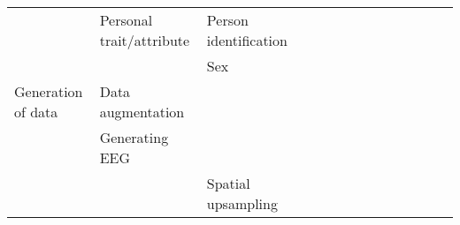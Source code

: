\begin{tabular}{p{1.5cm}p{1.5cm}p{1.5cm}p{1.5cm}p{0.6cm}p{0.6cm}p{0.6cm}p{0.6cm}p{0.6cm}p{0.6cm}p{0.6cm}p{0.6cm}p{0.6cm}p{0.6cm}}
                                & Personal trait/attribute & Person identification &   &                                                             &                                                                                                                             &                                                                        &                                      &                                                            &                      &                       &                                 &                         &                                        \cite{Zhang2017e, Zhang2017c} \\
                                &                 & Sex &   &                                                             &                                                                                                       \cite{VanPutten2018b} &                                                                        &                                      &                                                            &                      &                       &                                 &                         &                                                                      \\
Generation of data & Data augmentation &   &   &                                                             &                                                                                 \cite{Wang2018, Zhang2018b, Schwabedal2018} &                                                                        &                                      &                                                            &                      &                       &                                 &                         &                                                                      \\
                                & Generating EEG &   &   &                                                             &                                                                                                                             &                                                                        &                                      &                                                            &  \cite{Hartmann2018} &                       &                                 &                         &                                                                      \\
                                &                 & Spatial upsampling &   &                                                             &                                                                                                                             &                                                                        &                                      &                                                            &    \cite{Corley2018} &                       &                                 &                         &                                                                      \\

\end{tabular}
